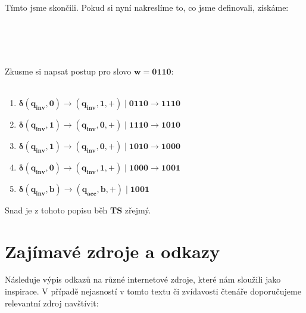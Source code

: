 \documentclass{report}
\begin{document}
\pagebreak
\\ \\Tímto jsme skončili. Pokud si nyní nakreslíme to, co jsme definovali, získáme:\\ \\
\begin{center}
\\ \\
\end{center}
Zkusme si napsat postup pro slovo $\mathbf{w = 0110}$:\\ \\
\begin{enumerate}
    \item $\mathbf{\delta(q_{inv},0) \rightarrow (q_{inv},1,+) \mid 0110 \rightarrow 1110}$
    \item $\mathbf{\delta(q_{inv},1) \rightarrow (q_{inv},0,+) \mid 1110 \rightarrow 1010}$ 
    \item $\mathbf{\delta(q_{inv},1) \rightarrow (q_{inv},0,+) \mid 1010 \rightarrow 1000}$ 
    \item $\mathbf{\delta(q_{inv},0) \rightarrow (q_{inv},1,+) \mid 1000 \rightarrow 1001}$
    \item $\mathbf{\delta(q_{inv},b) \rightarrow (q_{acc},b,+) \mid 1001}$ 
\end{enumerate}
Snad je z tohoto popisu běh \textbf{TS} zřejmý.
\chapter*{Zajímavé zdroje a odkazy}
Následuje výpis odkazů na různé internetové zdroje, které nám sloužili jako inspirace. V případě nejasností v tomto textu či zvídavosti čtenáře doporučujeme relevantní zdroj navštívit:
\end{document}
